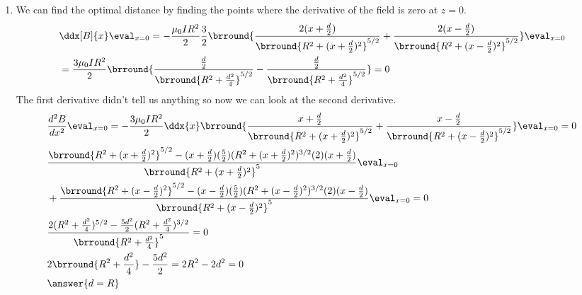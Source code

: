 {\begin{enumerate}
    \[\answer{|\vec{B}|(x)=\frac{\mu_0IR^2}{2}\brround{\frac{1}{\brround{R^2+(x+\frac{d}{2})^2}^{3/2}}+\frac{1}{\brround{R^2+(x-\frac{d}{2})^2}^{3/2}}}}\]
    \item We can find the optimal distance by finding the points where the derivative of the field is zero at $z=0$.
    \begin{align*}
        &\ddx[B]{x}\eval_{x=0}=-\frac{\mu_0IR^2}{2}\frac{3}{2}\brround{\frac{2(x+\frac{d}{2})}{\brround{R^2+(x+\frac{d}{2})^2}^{5/2}}+\frac{2(x-\frac{d}{2})}{\brround{R^2+(x-\frac{d}{2})^2}^{5/2}}}\eval_{x=0}\\
        &=\frac{3\mu_0IR^2}{2}\brround{\frac{\frac{d}{2}}{\brround{R^2+\frac{d^2}{4}}^{5/2}}-\frac{\frac{d}{2}}{\brround{R^2+\frac{d^2}{4}}^{5/2}}}=0\\
    \end{align*}
    The first derivative didn't tell us anything so now we can look at the second derivative.
    \begin{align*}
        &\frac{d^2B}{dx^2}\eval_{x=0}=-\frac{3\mu_0IR^2}{2}\ddx{x}\brround{\frac{x+\frac{d}{2}}{\brround{R^2+(x+\frac{d}{2})^2}^{5/2}}+\frac{x-\frac{d}{2}}{\brround{R^2+(x-\frac{d}{2})^2}^{5/2}}}\eval_{x=0}=0\\
        &\frac{\brround{R^2+(x+\frac{d}{2})^2}^{5/2}-(x+\frac{d}{2})(\frac{5}{2})(R^2+(x+\frac{d}{2})^2)^{3/2}(2)(x+\frac{d}{2})}{\brround{R^2+(x+\frac{d}{2})^2}^5}\eval_{x=0}\\&+\frac{\brround{R^2+(x-\frac{d}{2})^2}^{5/2}-(x-\frac{d}{2})(\frac{5}{2})(R^2+(x-\frac{d}{2})^2)^{3/2}(2)(x-\frac{d}{2})}{\brround{R^2+(x-\frac{d}{2})^2}^5}\eval_{x=0}=0\\
        &\frac{2(R^2+\frac{d^2}{4})^{5/2}-\frac{5d^2}{2}(R^2+\frac{d^2}{4})^{3/2}}{\brround{R^2+\frac{d^2}{4}}^5}=0\\
        &2\brround{R^2+\frac{d^2}{4}}-\frac{5d^2}{2}=2R^2-2d^2=0\\
        &\answer{d=R}
    \end{align*}
\end{enumerate}
}{}